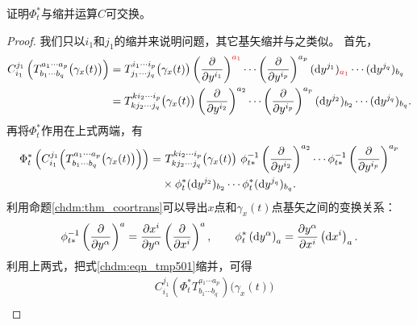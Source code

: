 \begin{proposition}\label{chdm:thm_cp-pc}
    证明$\Phi_t^*$与缩并运算$C$可交换。
\end{proposition}
\begin{proof}
    我们只以$i_1$和$j_1$的缩并来说明问题，其它基矢缩并与之类似。    首先，
    \begin{align*}
        C_{i_1}^{j_1} \left(T^{a_1 \cdots a_p}_{b_1\cdots b_q}\bigl(\gamma_x(t)\bigr) \right)
        &= T^{i_1 \cdots i_p}_{j_1\cdots j_q}\bigl(\gamma_x(t)\bigr)
        \left(\frac{\partial }{\partial y^{i_1}}\right)^{\color{red} a_1} \cdots 
        \left(\frac{\partial }{\partial y^{i_p}}\right)^{a_p} 
        ({\rm d}y^{j_1})_{\color{red} a_1} \cdots  ({\rm d}y^{j_q})_{b_q} \\
        &= T^{k i_2 \cdots i_p}_{k j_2\cdots j_q}\bigl(\gamma_x(t)\bigr)
        \left(\frac{\partial }{\partial y^{i_2}}\right)^{a_2} \cdots 
        \left(\frac{\partial }{\partial y^{i_p}}\right)^{a_p} 
        ({\rm d}y^{j_2})_{b_2} \cdots  ({\rm d}y^{j_q})_{b_q} .
    \end{align*}
再将$\Phi_t^*$作用在上式两端，有
    \begin{align}
        \Phi_t^* \left(  C_{i_1}^{j_1} \Bigl( T^{a_1 \cdots a_p}_{b_1\cdots b_q}\bigl(\gamma_x(t)\bigr)\Bigr) \right) 
        =& \ T^{k i_2 \cdots i_p}_{k j_2\cdots j_q}\bigl(\gamma_x(t)\bigr) \ 
        \phi_{t*} ^{-1}  \left(\frac{\partial }{\partial y^{i_2}}\right)^{a_2} \cdots 
        \phi_{t*} ^{-1} \left(\frac{\partial }{\partial y^{i_p}}\right)^{a_p} \notag\\
        & \times \phi_{t}^{*}({\rm d}y^{j_2})_{b_2} \cdots \phi_{t}^{*} ({\rm d}y^{j_q})_{b_q}  .
        \label{chdm:eqn_tmpa852}
    \end{align}
利用命题\ref{chdm:thm_coortrans}可以导出$x$点和$\gamma_x(t)$点基矢之间的变换关系：
\begin{equation}\label{chdm:eqn_tmp-transxy}
    \phi_{t*}^{-1} \left(\frac{\partial}{\partial y^\alpha}\right)^a 
     = \frac{\partial x^i}{\partial y^\alpha}
    \left(\frac{\partial}{\partial x^i}\right)^a , \qquad
    {\phi^{*}_{t}}\left( {{\rm{d}}{y^\alpha }} \right)_a =
    \frac{{\partial {y^\alpha }}}{{\partial {x^i}}} 
    \left( {{\rm{d}}{x^i }} \right)_a  .
\end{equation}
利用上两式，把式\eqref{chdm:eqn_tmp501}缩并，可得
\begin{equation*}%
    \begin{aligned}
       &C_{i_1}^{j_1}\left (\Phi_t^* T^{a_1 \cdots a_p}_{b_1\cdots b_q}\right)\bigl(\gamma_x(t)\bigr) \\

\end{aligned}
\end{equation*}
\end{proof}
